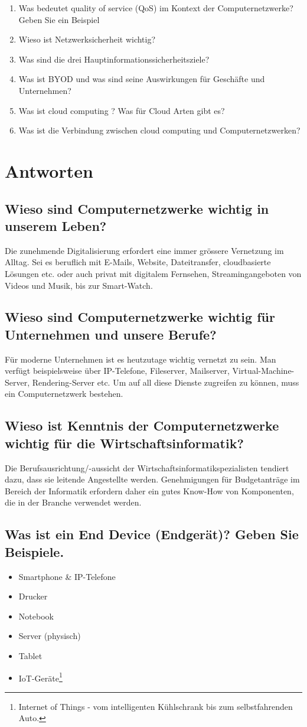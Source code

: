 \begin{enumerate}
    \item Was bedeutet \flqq quality of service (QoS)\frqq{}  im Kontext der Computernetzwerke? Geben Sie ein Beispiel
    \item Wieso ist Netzwerksicherheit wichtig?
    \item Was sind die drei Hauptinformationssicherheitsziele?
    \item Was ist \flqq BYOD\frqq{}  und was sind seine Auswirkungen für Geschäfte und Unternehmen?
    \item Was ist \flqq cloud computing\frqq{} ? Was für Cloud Arten gibt es?
    \item Was ist die Verbindung zwischen \flqq cloud computing\frqq{}  und Computernetzwerken?
\end{enumerate}

\section{Antworten}
\subsection*{Wieso sind Computernetzwerke wichtig in unserem Leben?}
Die zunehmende Digitalisierung erfordert eine immer grössere Vernetzung im Alltag. Sei es beruflich mit E-Mails, Website, Dateitransfer, cloudbasierte Lösungen etc. oder auch privat mit digitalem Fernsehen, Streamingangeboten von Videos und Musik, bis zur Smart-Watch.
\subsection*{Wieso sind Computernetzwerke wichtig für Unternehmen und unsere Berufe?}
Für moderne Unternehmen ist es heutzutage wichtig vernetzt zu sein. Man verfügt beispielsweise über IP-Telefone, Fileserver, Mailserver, Virtual-Machine-Server, Rendering-Server etc. Um auf all diese Dienste zugreifen zu können, muss ein Computernetzwerk bestehen.
\subsection*{Wieso ist Kenntnis der Computernetzwerke wichtig für die Wirtschaftsinformatik?}
Die Berufsausrichtung/-aussicht der Wirtschaftsinformatikspezialisten tendiert dazu, dass sie leitende Angestellte werden. Genehmigungen für Budgetanträge im Bereich der Informatik erfordern daher ein gutes Know-How von Komponenten, die in der Branche verwendet werden.
\subsection*{Was ist ein \flqq End Device\frqq{} (Endgerät)? Geben Sie Beispiele.}
\begin{itemize}
    \item Smartphone \& IP-Telefone
    \item Drucker
    \item Notebook
    \item Server (physisch)
    \item Tablet
    \item IoT-Geräte\footnote{Internet of Things - vom intelligenten Kühlschrank bis zum selbstfahrenden Auto.}
\end{itemize}
